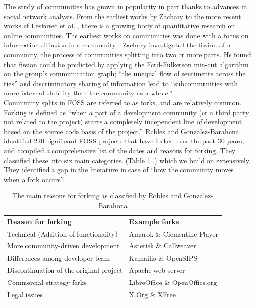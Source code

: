 \documentclass[conference]{IEEEtran}
\begin{document}
The study of communities has grown in popularity in part thanks to advances in social network analysis.  From the earliest works by Zachary \cite{Zachary} to the more recent works of Leskovec et al. \cite{LeskovecGraphsOverTime}\cite{LeskovecStatisticalPropertiesOfCommunityStructure}, there is a growing body of quantitative research on online communities. The earliest works on communities was done with a focus on information diffusion in a community \cite{Zachary}.  Zachary investigated the fission of a community, the process of communities splitting into two or more parts. He found that fission could be predicted by applying the Ford-Fulkerson min-cut algorithm \cite{Ford} on the group's communication graph; ``the unequal flow of sentiments across the ties'' and discriminatory sharing of information lead to ``subcommunities with more internal stability than the community as a whole.''\\

Community splits in FOSS are referred to as forks, and are relatively common. Forking is defined as ``when a part of a development community (or a third party not related to the project) starts a completely independent line of development based on the source code basis of the project.'' Robles and Gonzalez-Barahona \cite{Robles} identified 220 significant FOSS projects that have forked over the past 30 years, and compiled a comprehensive list of the dates and reasons for forking. They classified these into six main categories. (Table \ref{tableReasonsForForking} .) which we build on extensively. They identified a gap in the literature in case of ``how the community moves when a fork occurs''.\\

\begin{table}[!htbp]
\centering
\caption{The main reasons for forking as classified by Robles and Gonzalez-Barahona \cite{Robles}}
\label{tableReasonsForForking}
\begin{tabular}{p{} p{}}
\hline\noalign{\smallskip}
\textbf{Reason for forking} & \textbf{Example forks} \\
\noalign{\smallskip}\hline\noalign{\smallskip}
Technical (Addition of functionality) & Amarok \& Clementine Player \\ \hline
More community-driven development & Asterisk \& Callweaver \\ \hline
Differences among developer team & Kamailio \& OpenSIPS \\ \hline
Discontinuation of the original project & Apache web server \\ \hline
Commercial strategy forks & LibreOffice \& OpenOffice.org \\ \hline
Legal issues & X.Org \& XFree \\
\noalign{\smallskip}\hline
\end{tabular}
\end{table}
\end{document}
